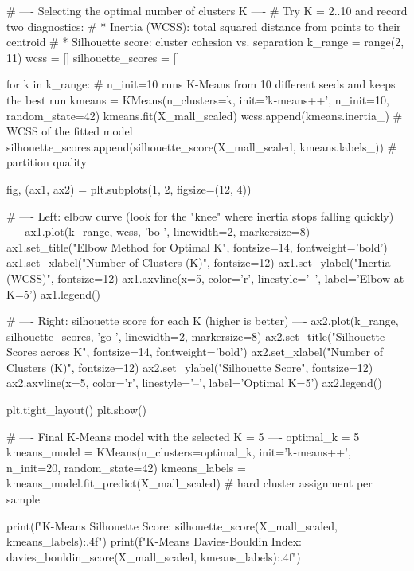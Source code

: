 \begin{codebox}[title={Listing 1.3 Select K with the elbow and silhouette curves}]
# ---- Selecting the optimal number of clusters K ----
# Try K = 2..10 and record two diagnostics:
#   * Inertia (WCSS): total squared distance from points to their centroid
#   * Silhouette score: cluster cohesion vs. separation
k_range = range(2, 11)
wcss = []
silhouette_scores = []

for k in k_range:
    # n_init=10 runs K-Means from 10 different seeds and keeps the best run
    kmeans = KMeans(n_clusters=k, init='k-means++', n_init=10, random_state=42)
    kmeans.fit(X_mall_scaled)
    wcss.append(kmeans.inertia_)                                               # WCSS of the fitted model
    silhouette_scores.append(silhouette_score(X_mall_scaled, kmeans.labels_))  # partition quality

fig, (ax1, ax2) = plt.subplots(1, 2, figsize=(12, 4))

# ---- Left: elbow curve (look for the "knee" where inertia stops falling quickly) ----
ax1.plot(k_range, wcss, 'bo-', linewidth=2, markersize=8)
ax1.set_title("Elbow Method for Optimal K", fontsize=14, fontweight='bold')
ax1.set_xlabel("Number of Clusters (K)", fontsize=12)
ax1.set_ylabel("Inertia (WCSS)", fontsize=12)
ax1.axvline(x=5, color='r', linestyle='--', label='Elbow at K=5')
ax1.legend()

# ---- Right: silhouette score for each K (higher is better) ----
ax2.plot(k_range, silhouette_scores, 'go-', linewidth=2, markersize=8)
ax2.set_title("Silhouette Scores across K", fontsize=14, fontweight='bold')
ax2.set_xlabel("Number of Clusters (K)", fontsize=12)
ax2.set_ylabel("Silhouette Score", fontsize=12)
ax2.axvline(x=5, color='r', linestyle='--', label='Optimal K=5')
ax2.legend()

plt.tight_layout()
plt.show()
\end{codebox}

\begin{codebox}[title={Listing 1.4 Final K-means model (K = 5)}]
# ---- Final K-Means model with the selected K = 5 ----
optimal_k = 5
kmeans_model = KMeans(n_clusters=optimal_k, init='k-means++', n_init=20, random_state=42)
kmeans_labels = kmeans_model.fit_predict(X_mall_scaled)  # hard cluster assignment per sample

print(f"K-Means Silhouette Score: {silhouette_score(X_mall_scaled, kmeans_labels):.4f}")
print(f"K-Means Davies-Bouldin Index: {davies_bouldin_score(X_mall_scaled, kmeans_labels):.4f}")
\end{codebox}
